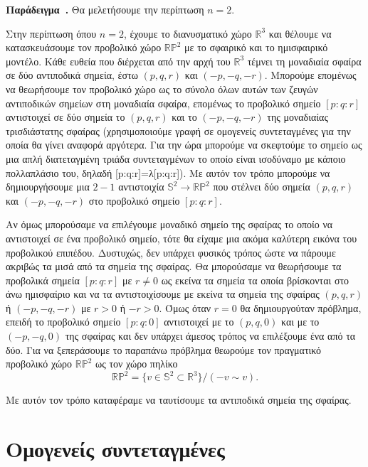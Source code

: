 \documentclass[12pt, a4paper]{book}
\newcounter{example}[section]
\newenvironment{example}[1][]{\refstepcounter{example}\par\medskip
   \textbf{Παράδειγμα~\theexample. #1} \rmfamily}{\medskip}
\begin{document}
\begin{example}
Θα μελετήσουμε την περίπτωση $n = 2$.

Στην περίπτωση όπου $n = 2$, έχουμε το διανυσματικό χώρο $\mathbb{R}^3$ και θέλουμε να κατασκευάσουμε τον προβολικό χώρο $\mathbb{R}\mathbb{P}^2$ με το σφαιρικό και το ημισφαιρικό μοντέλο. Κάθε ευθεία που διέρχεται από την αρχή του $\mathbb{R}^3$  τέμνει τη μοναδιαία σφαίρα σε δύο αντιποδικά σημεία, έστω $(p,q,r)$ και $(-p,-q,-r)$. Μπορούμε επομένως να θεωρήσουμε τον προβολικό χώρο ως το σύνολο όλων αυτών των ζευγών αντιποδικών σημείων στη μοναδιαία σφαίρα, επομένως το προβολικό σημείο $[p:q:r]$ αντιστοιχεί σε δύο σημεία το $(p,q,r)$ και το $(-p,-q,-r)$ της μοναδιαίας τρισδιάστατης σφαίρας (χρησιμοποιούμε γραφή σε ομογενείς συντεταγμένες για την οποία θα γίνει αναφορά αργότερα. Για την ώρα μπορούμε να σκεφτούμε το σημείο ως μια απλή διατεταγμένη τριάδα συντεταγμένων το οποίο είναι ισοδύναμο με κάποιο πολλαπλάσιο του, δηλαδή [p:q:r]=λ[p:q:r]). Με αυτόν τον τρόπο μπορούμε να δημιουργήσουμε μια $2-1$ αντιστοιχία $\mathbb{S}^2 \rightarrow \mathbb{R}\mathbb{P}^2$ που στέλνει δύο σημεία $(p,q,r)$ και $(-p,-q,-r)$ στο προβολικό σημείο $[p:q:r]$.

Αν όμως μπορούσαμε να επιλέγουμε μοναδικό σημείο της σφαίρας το οποίο να αντιστοιχεί σε ένα προβολικό σημείο, τότε θα είχαμε μια ακόμα καλύτερη εικόνα του προβολικού επιπέδου. Δυστυχώς, δεν υπάρχει φυσικός τρόπος ώστε να πάρουμε ακριβώς τα μισά από τα σημεία της σφαίρας. Θα μπορούσαμε να θεωρήσουμε τα προβολικά σημεία $[p:q:r]$ με $r \neq 0$ ως εκείνα τα σημεία τα οποία βρίσκονται στο άνω ημισφαίριο και να τα αντιστοιχίσουμε με εκείνα τα σημεία της σφαίρας  $(p,q,r)$ ή $(-p,-q,-r)$ με $r > 0$ ή $-r >0$. Όμως όταν $r=0$ θα δημιουργούταν πρόβλημα, επειδή το προβολικό σημείο $[p:q:0]$ αντιστοιχεί με το $(p,q,0)$ και με το $(-p,-q,0)$ της σφαίρας και δεν υπάρχει άμεσος τρόπος να επιλέξουμε ένα από τα δύο. 
Για να ξεπεράσουμε το παραπάνω πρόβλημα θεωρούμε τον πραγματικό προβολικό χώρο $\mathbb{R}\mathbb{P}^2$  ως τον χώρο πηλίκο 
\begin{displaymath}
\mathbb{R}\mathbb{P}^2 =\{ v \in \mathbb{S}^2  \subset \mathbb{R}^3\}\big/ (-v \sim  v).
\end{displaymath}

Με αυτόν τον τρόπο καταφέραμε να ταυτίσουμε τα αντιποδικά σημεία της σφαίρας.

\end{example}

\section{Ομογενείς συντεταγμένες}
\end{document}
